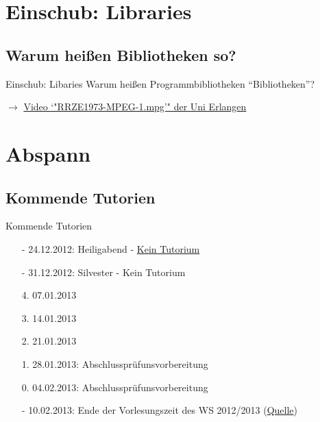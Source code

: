 \documentclass[usepdftitle=false,hyperref={pdfpagelabels=false}]{beamer}
\begin{document}
\section{Einschub: Libraries}
\subsection{Warum heißen Bibliotheken so?}
\begin{frame}{Einschub: Libaries}
    Warum heißen Programmbibliotheken "`Bibliotheken"'?


    $\rightarrow$ \href{http://www.rrze.uni-erlangen.de/wir-ueber-uns/publikationen/das-rrze-der-film.shtml}{Video `"RRZE1973-MPEG-1.mpg'" der Uni Erlangen}
\end{frame}

\section{Abspann}
\subsection{Kommende Tutorien}
\begin{frame}{Kommende Tutorien}
  \begin{itemize}
    \item[-] 24.12.2012: Heiligabend - \href{http://www.fmc.uni-karlsruhe.de/faq/wann-sind-die-weihnachtsferien}{Kein Tutorium}
    \item[-] 31.12.2012: Silvester - Kein Tutorium
    \item[4.] 07.01.2013
    \item[3.] 14.01.2013
    \item[2.] 21.01.2013
    \item[1.] 28.01.2013: Abschlussprüfunsvorbereitung
    \item[0.] 04.02.2013: Abschlussprüfunsvorbereitung
    \item[-] 10.02.2013: Ende der Vorlesungszeit des WS 2012/2013 (\href{http://www.kit.edu/studieren/2873.php}{Quelle})
  \end{itemize}
\end{frame}

\end{document}
